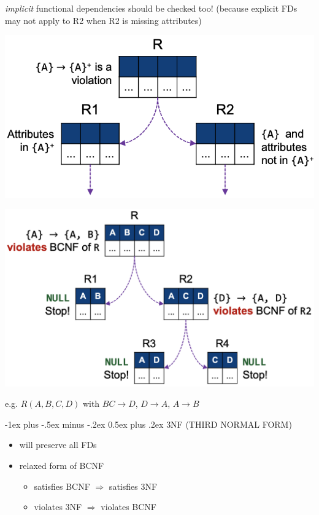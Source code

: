 \documentclass[10pt, landscape]{article}
\makeatletter
\renewcommand{\section}{\@startsection{section}{1}{0mm}%
  {-1ex plus -.5ex minus -.2ex}%
  {0.5ex plus .2ex}%
{\normalfont\large\bfseries}}
\makeatother
\begin{document}
\begin{multicols*}{4}
  \attention \textit{implicit} functional dependencies should be checked too! (because explicit FDs may not apply to R2 when R2 is missing attributes)

  \begin{tightcenter}
    \begin{minipage}[c]{0.47\linewidth}
      \includegraphics[width=0.95\linewidth]{cs2102-bcnf-decomposition.png} 
    \end{minipage}
    \begin{minipage}[c]{0.47\linewidth}
      \includegraphics[width=0.95\linewidth]{cs2102-bcnf-decomposition-example.png} 
    \end{minipage}
    e.g. $R(A,B,C,D)$ with $BC \rightarrow D$, $D \rightarrow A$,  $A \rightarrow B$
  \end{tightcenter}

  \section{3NF (THIRD NORMAL FORM)}
  \begin{itemize}
    \item will preserve all FDs
    \item relaxed form of BCNF
      \begin{itemize}
        \item satisfies BCNF $\Rightarrow$ satisfies 3NF
        \item violates 3NF $\Rightarrow$ violates BCNF
      \end{itemize}
  \end{itemize}


\end{multicols*}
\end{document}
